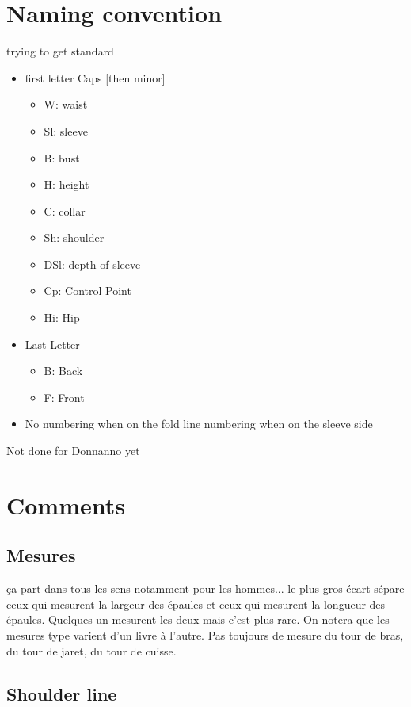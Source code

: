\documentclass[11pt,a4paper]{report}
\begin{document}
\section{Naming convention}

trying to get standard
\begin{itemize}
\item		first letter Caps [then minor]
\begin{itemize}
\item		W: waist
\item		Sl: sleeve
\item		B: bust
\item		H: height
\item		C: collar
\item		Sh: shoulder
\item		DSl: depth of sleeve
\item		Cp: Control Point
\item		Hi: Hip
\end{itemize}

\item		Last Letter
\begin{itemize}
\item		B: Back
\item		F: Front
\end{itemize}

\item		No numbering when on the fold line numbering when on the sleeve side
\end{itemize}


Not done for Donnanno yet

\section{Comments}

\subsection{Mesures}
ça part dans tous les sens notamment pour les hommes... le plus gros écart sépare ceux qui mesurent la largeur des épaules et ceux qui mesurent la longueur des épaules. Quelques un mesurent les deux mais c'est plus rare. On notera que les mesures type varient d'un livre à l'autre. Pas toujours de mesure du tour de bras, du tour de jaret, du tour de cuisse.

\subsection{Shoulder line}
\end{document}
